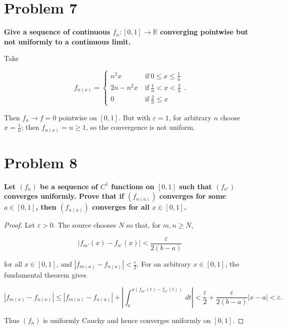 \section{Problem 7}

\textbf{Give a sequence of continuous \(f_{n}:\left\lbrack {0,1} \right\rbrack\rightarrow\mathbb{R}\) converging pointwise but not uniformly to a continuous limit.}

Take

\[f_{n{(x)}} = \left\{ \begin{matrix}
{n^{2}x\ } & {\text{if}\ 0 \leq x \leq \frac{1}{n}} \\
{2n - n^{2}x\ } & {\text{if}\ \frac{1}{n} < x < \frac{2}{n}} \\
{0\ } & {\text{if}\ \frac{2}{n} \leq x}
\end{matrix} \right..\]

Then \(f_{n}\rightarrow f = 0\) pointwise on \(\left\lbrack {0,1} \right\rbrack\). But with \(\varepsilon = 1\), for arbitrary \(n\) choose \(x = \frac{1}{n}\); then \(f_{n{(x)}} = n \geq 1\), so the convergence is not uniform.

\section{Problem 8}

\textbf{Let \(\left( f_{n} \right)\) be a sequence of \(C^{1}\) functions on \(\left\lbrack {0,1} \right\rbrack\) such that \(\left( f_{n'} \right)\) converges uniformly. Prove that if \(\left( f_{n{(a)}} \right)\) converges for some \(a \in \left\lbrack {0,1} \right\rbrack\), then \(\left( f_{n{(x)}} \right)\) converges for all \(x \in \left\lbrack {0,1} \right\rbrack\).}

\begin{proof}

Let \(\varepsilon > 0\). The source chooses \(N\) so that, for \(m,n \geq N\),

\[\left| {f_{m'}(x) - f_{n'}(x)} \right| < \frac{\varepsilon}{2\left( {b - a} \right)}\]

for all \(x \in \left\lbrack {0,1} \right\rbrack\), and \(\left| {f_{m{(a)}} - f_{n{(a)}}} \right| < \frac{\varepsilon}{2}\). For an arbitrary \(x \in \left\lbrack {0,1} \right\rbrack\), the fundamental theorem gives

\[\left| {f_{m{(x)}} - f_{n{(x)}}} \right| \leq \left| {f_{m{(a)}} - f_{n{(a)}}} \right| + \left| {\int_{a}^{x{({f_{m'}{(t)} - f_{n'}{(t)}})}}\, dt} \right| < \frac{\varepsilon}{2} + \frac{\varepsilon}{2\left( {b - a} \right)}\left| {x - a} \right| < \varepsilon.\]

Thus \(\left( f_{n} \right)\) is uniformly Cauchy and hence converges uniformly on \(\left\lbrack {0,1} \right\rbrack\).

\end{proof}

